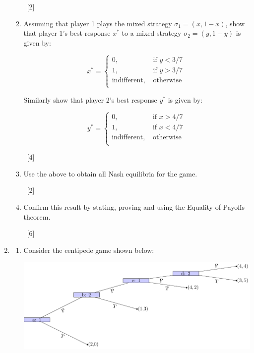 \documentclass[12pt,a4paper]{article}
\begin{document}
\begin{enumerate}
\begin{enumerate}
        ~\hfill{[2]}

        \item Assuming that player 1 plays the mixed strategy $\sigma_1=(x,1-x)$, show that player 1's best response $x^*$ to a mixed strategy $\sigma_2 = (y,1-y)$ is given by:


            \[
            x^*=\begin{cases}
                0,&\text{ if } y < 3/7\\
                1,&\text{ if } y > 3/7\\
                \text{indifferent},&\text{ otherwise }\\
            \end{cases}
            \]

            Similarly show that player 2's best response $y^*$ is given by:

            \[
            y^*=\begin{cases}
                0,&\text{ if } x > 4/7\\
                1,&\text{ if } x < 4/7\\
                \text{indifferent},&\text{ otherwise }\\
            \end{cases}
            \]

        ~\hfill{[4]}

        \item Use the above to obtain all Nash equilibria for the game.

        ~\hfill{[2]}

        \item Confirm this result by stating, proving and using the Equality of Payoffs theorem.

        ~\hfill{[6]}

    \end{enumerate}

\newpage
\item

    \begin{enumerate}

            \item Consider the centipede game shown below:

            \begin{center}
                \includegraphics[width=.8\textwidth]{images/mock-img01.pdf}
            \end{center}


\end{enumerate}
\end{enumerate}
\end{document}
